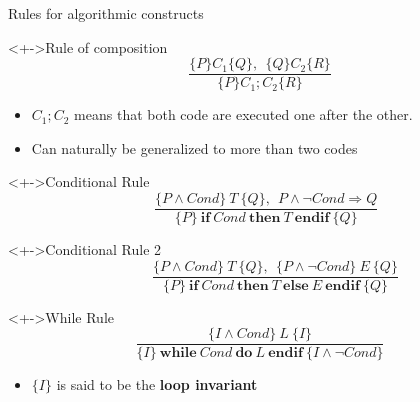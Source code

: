 \begin{frame}{Rules for algorithmic constructs}
  \begin{block}<+->{Rule of composition}\vspace{-2\baselineskip}
    $$\frac{\{P\} C_1 \{Q\},~~ \{Q\} C_2 \{R\}}{\{P\} C_1;C_2 \{R\}}$$    
    \begin{itemize}
    \item   $C_1;C_2$ means that both code are executed one after the other.
    \item Can naturally be generalized to more than two codes
    \end{itemize}
  \end{block}

  \begin{block}<+->{Conditional Rule}\vspace{-2\baselineskip}
    $$~~~~\frac{\{P\wedge Cond\} ~T~ \{Q\},~~ P\wedge\neg Cond\Rightarrow Q}{\{P\} \mathbf{~if~} Cond \mathbf{~then~} T \mathbf{~endif~} \{Q\}}$$
  \end{block}

  \begin{block}<+->{Conditional Rule 2}\vspace{-2\baselineskip}
    $$~~~~~~~~~~\frac{\{P\wedge Cond\} ~T~ \{Q\},~~ \{P\wedge\neg Cond\} ~E~
      \{Q\}}{\{P\} \mathbf{~if~} Cond \mathbf{~then~} T \mathbf{~else~} E \mathbf{~endif~} \{Q\}}$$
  \end{block}


  \begin{block}<+->{While Rule}\vspace{-2\baselineskip}
    $$\frac{\{I\wedge Cond\} ~L~ \{I\}}
            {\{I\} \mathbf{~while~} Cond \mathbf{~do~} 
                   L \mathbf{~endif~} \{I\wedge\neg Cond\}}$$
    \begin{itemize}\vspace{-.5\baselineskip}
    \item $\{I\}$ is said to be the \alert{\textbf{loop invariant}}
    \end{itemize}
  \end{block}
\end{frame}
